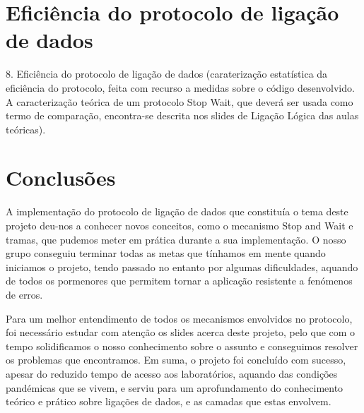 \documentclass[article, a4paper, 11pt, oneside]{memoir}
\begin{document}
\newpage
\chapter[Eficiência do protocolo de ligação de dados][Eficiência do protocolo de ligação de dados]{Eficiência do protocolo de ligação de dados} \label{\thechapter}

8. Eficiência do protocolo de ligação de dados (caraterização estatística da  eficiência do protocolo, feita com recurso a medidas sobre o código desenvolvido. 
A caracterização teórica de um protocolo Stop Wait, que 
   deverá ser usada como termo de comparação, encontra-se descrita nos slides de Ligação Lógica das aulas teóricas).


\newpage
\chapter[Conclusões][Conclusões]{Conclusões} \label{\thechapter}

A implementação do protocolo de ligação de dados que constituía o tema deste projeto deu-nos a conhecer novos conceitos, como o mecanismo Stop and Wait e tramas, 
que pudemos meter em prática durante a sua implementação. O nosso grupo conseguiu terminar todas as metas que tínhamos em mente quando iniciamos o projeto,
 tendo passado no entanto por algumas dificuldades, aquando de todos os pormenores que permitem tornar a aplicação resistente a fenómenos de erros. 
 
 Para um melhor entendimento de todos os mecanismos envolvidos no protocolo, foi necessário estudar com atenção os slides acerca deste projeto, pelo que com o tempo solidificamos o 
 nosso conhecimento sobre o assunto e conseguimos resolver os problemas que encontramos.
Em suma, o projeto foi concluído com sucesso, apesar do reduzido tempo de acesso aos laboratórios, aquando das condições pandémicas que se vivem, e serviu para um aprofundamento 
do conhecimento teórico e prático sobre ligações de dados, e as camadas que estas envolvem.
\end{document}
